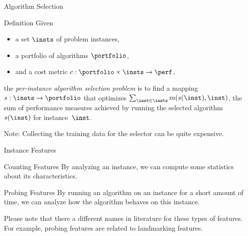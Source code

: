 \begin{frame}[c]{Algorithm Selection~}

\begin{block}{Definition}
Given 
\begin{itemize}
  \item a set $\insts$ of problem instances,
  \item a portfolio of algorithms $\portfolio$,
  \item and a cost metric $c:  \portfolio \times \insts \rightarrow \perf$,   
\end{itemize}
 
the \emph{per-instance algorithm selection problem} is to find a mapping 
$s: \insts \rightarrow \portfolio$ 
that optimizes $\sum_{\inst \in \insts} m(s(\inst),\inst)$, 
the sum of performance measures achieved by running the selected algorithm $s(\inst)$ for instance~$\inst$.
\end{block}

\bigskip

\scalebox{0.8}{

}

\bigskip
\pause
Note: Collecting the training data for the selector can be quite expensive.

\end{frame}
\begin{frame}[c]{Instance Features}

\begin{block}{Counting Features}
By analyzing an instance, we can compute some statistics about its characteristics. \\
\end{block}

\bigskip

\begin{block}{Probing Features}
By running an algorithm on an instance for a short amount of time,
we can analyze how the algorithm behaves on this instance.\\
\end{block}

\bigskip
\pause

Please note that there a different names in literature for these types of features.
For example, probing features are related to landmarking features.

\end{frame}
